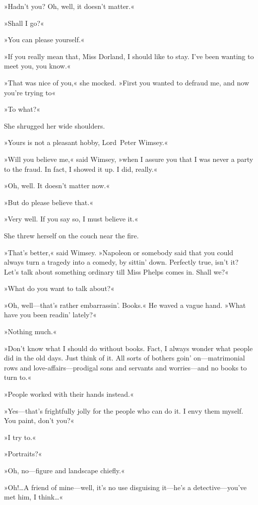 »Hadn't you? Oh, well, it doesn't matter.«

»Shall I go?«

»You can please yourself.«

»If you really mean that, Miss Dorland, I should like to stay. I've been wanting to meet you, you know.«

»That was nice of you,« she mocked. »First you wanted to defraud me, and now you're trying to\longdash«

»To what?«

She shrugged her wide shoulders.

»Yours is not a pleasant hobby, Lord~Peter Wimsey.«

»Will you believe me,« said Wimsey, »when I assure you that I was never a party to the fraud. In fact, I showed it up. I did, really.«

»Oh, well. It doesn't matter now.«

»But do please believe that.«

»Very well. If you say so, I must believe it.«

She threw herself on the couch near the fire.

»That's better,« said Wimsey. »Napoleon or somebody said that you could always turn a tragedy into a comedy, by sittin' down. Perfectly true, isn't it? Let's talk about something ordinary till Miss Phelps comes in. Shall we?«

»What do you want to talk about?«

»Oh, well—that's rather embarrassin'. Books.« He waved a vague hand. »What have you been readin' lately?«

»Nothing much.«

»Don't know what I should do without books. Fact, I always wonder what people did in the old days. Just think of it. All sorts of bothers goin' on—matrimonial rows and love-affairs—prodigal sons and servants and worries—and no books to turn to.«

»People worked with their hands instead.«

»Yes—that's frightfully jolly for the people who can do it. I envy them myself. You paint, don't you?«

»I try to.«

»Portraits?«

»Oh, no—figure and landscape chiefly.«

»Oh!\dots A friend of mine—well, it's no use disguising it—he's a detective—you've met him, I think\dots«


